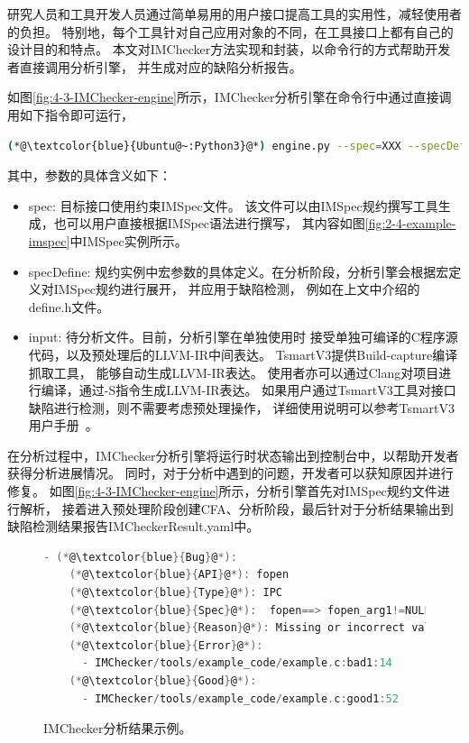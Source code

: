 研究人员和工具开发人员通过简单易用的用户接口提高工具的实用性，减轻使用者的负担。
特别地，每个工具针对自己应用对象的不同，在工具接口上都有自己的设计目的和特点。
本文对IMChecker方法实现和封装，以命令行的方式帮助开发者直接调用分析引擎，
并生成对应的缺陷分析报告。

如图\ref{fig:4-3-IMChecker-engine}所示，IMChecker分析引擎在命令行中通过直接调用如下指令即可运行，
\begin{lstlisting}[language={bash},
basicstyle=\linespread{0.8}\listingsfont,
numbers=none,
xleftmargin=.1\textwidth]
(*@\textcolor{blue}{Ubuntu@~:Python3}@*) engine.py --spec=XXX --specDefine=XXX --input=XXX
\end{lstlisting}
其中，参数的具体含义如下：
\begin{itemize}
	\item spec: 目标接口使用约束IMSpec文件。
	该文件可以由IMSpec规约撰写工具生成，也可以用户直接根据IMSpec语法进行撰写，
	其内容如图\ref{fig:2-4-example-imspec}中IMSpec实例所示。
	\item specDefine: 规约实例中宏参数的具体定义。在分析阶段，分析引擎会根据宏定义对IMSpec规约进行展开，
	并应用于缺陷检测，
	例如在上文中介绍的define.h文件。
	\item input: 待分析文件。目前，分析引擎在单独使用时
	接受单独可编译的C程序源代码，以及预处理后的LLVM-IR中间表达。
	TsmartV3提供Build-capture编译抓取工具，
	能够自动生成LLVM-IR表达。
	使用者亦可以通过Clang对项目进行编译，通过-S指令生成LLVM-IR表达。
	如果用户通过TsmartV3工具对接口缺陷进行检测，则不需要考虑预处理操作，
	详细使用说明可以参考TsmartV3用户手册~\cite{tsmart}。
\end{itemize}

在分析过程中，IMChecker分析引擎将运行时状态输出到控制台中，以帮助开发者获得分析进展情况。
同时，对于分析中遇到的问题，开发者可以获知原因并进行修复。
如图\ref{fig:4-3-IMChecker-engine}所示，分析引擎首先对IMSpec规约文件进行解析，
接着进入预处理阶段创建CFA、分析阶段，最后针对于分析结果输出到缺陷检测结果报告IMCheckerResult.yaml中。

\begin{figure}[b]
	\centering
	\begin{minipage}{0.7\linewidth}
\begin{lstlisting}[language={C},
basicstyle=\linespread{0.7}\listingsfont,
numbers=none,frame=trBL,
xleftmargin=0pt]
  - (*@\textcolor{blue}{Bug}@*):
    (*@\textcolor{blue}{API}@*): fopen
    (*@\textcolor{blue}{Type}@*): IPC
    (*@\textcolor{blue}{Spec}@*):  fopen==> fopen_arg1!=NULL
    (*@\textcolor{blue}{Reason}@*): Missing or incorrect validation of parameter
    (*@\textcolor{blue}{Error}@*): 
      - IMChecker/tools/example_code/example.c:bad1:14
    (*@\textcolor{blue}{Good}@*): 
      - IMChecker/tools/example_code/example.c:good1:52
\end{lstlisting}
	\end{minipage}
	\caption{
		IMChecker分析结果示例。
	}
	\label{fig:4-3-Result}
\end{figure}

